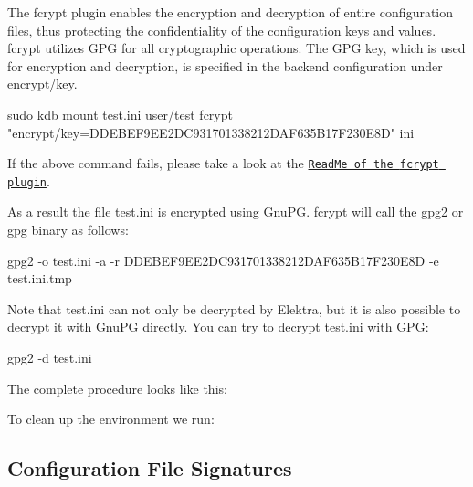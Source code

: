 The {\ttfamily fcrypt} plugin enables the encryption and decryption of entire configuration files, thus protecting the confidentiality of the configuration keys and values. {\ttfamily fcrypt} utilizes G\+PG for all cryptographic operations. The G\+PG key, which is used for encryption and decryption, is specified in the backend configuration under {\ttfamily encrypt/key}. \begin{DoxyVerb}    sudo kdb mount test.ini user/test fcrypt "encrypt/key=DDEBEF9EE2DC931701338212DAF635B17F230E8D" ini
\end{DoxyVerb}


If the above command fails, please take a look at the \href{https://master.libelektra.org/src/plugins/fcrypt/README.md#known-issues}{\tt Read\+Me of the {\ttfamily fcrypt} plugin}.

As a result the file {\ttfamily test.\+ini} is encrypted using Gnu\+PG. {\ttfamily fcrypt} will call the {\ttfamily gpg2} or {\ttfamily gpg} binary as follows\+: \begin{DoxyVerb}    gpg2 -o test.ini -a -r DDEBEF9EE2DC931701338212DAF635B17F230E8D -e test.ini.tmp
\end{DoxyVerb}


Note that {\ttfamily test.\+ini} can not only be decrypted by Elektra, but it is also possible to decrypt it with Gnu\+PG directly. You can try to decrypt {\ttfamily test.\+ini} with G\+PG\+: \begin{DoxyVerb}    gpg2 -d test.ini
\end{DoxyVerb}


The complete procedure looks like this\+:




To clean up the environment we run\+:




\subsection*{Configuration File Signatures}

